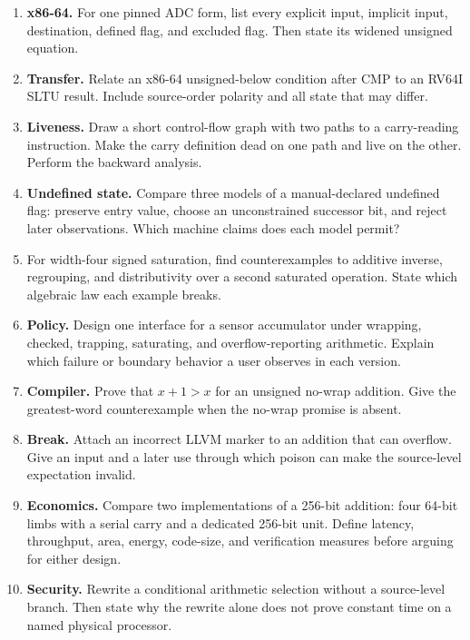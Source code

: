 \begin{enumerate}
\item \textbf{x86-64.} For one pinned ADC form, list every explicit input,
implicit input, destination, defined flag, and excluded flag. Then state its
widened unsigned equation.

\item \textbf{Transfer.} Relate an x86-64 unsigned-below condition after CMP
to an RV64I SLTU result. Include source-order polarity and all state that may
differ.

\item \textbf{Liveness.} Draw a short control-flow graph with two paths to a
carry-reading instruction. Make the carry definition dead on one path and
live on the other. Perform the backward analysis.

\item \textbf{Undefined state.} Compare three models of a manual-declared
undefined flag: preserve entry value, choose an unconstrained successor bit,
and reject later observations. Which machine claims does each model permit?

\item For width-four signed saturation, find counterexamples to additive
inverse, regrouping, and distributivity over a second saturated operation.
State which algebraic law each example breaks.

\item \textbf{Policy.} Design one interface for a sensor accumulator under wrapping,
checked, trapping, saturating, and overflow-reporting arithmetic. Explain which
failure or boundary behavior a user observes in each version.

\item \textbf{Compiler.} Prove that \(x+1>x\) for an unsigned no-wrap addition.
Give the greatest-word counterexample when the no-wrap promise is absent.

\item \textbf{Break.} Attach an incorrect LLVM  marker to an
addition that can overflow. Give an input and a later use through which poison
can make the source-level expectation invalid.

\item \textbf{Economics.} Compare two implementations of a 256-bit addition:
four 64-bit limbs with a serial carry and a dedicated 256-bit unit. Define
latency, throughput, area, energy, code-size, and verification measures before
arguing for either design.

\item \textbf{Security.} Rewrite a conditional arithmetic selection without a
source-level branch. Then state why the rewrite alone does not prove constant
time on a named physical processor.


\end{enumerate}
